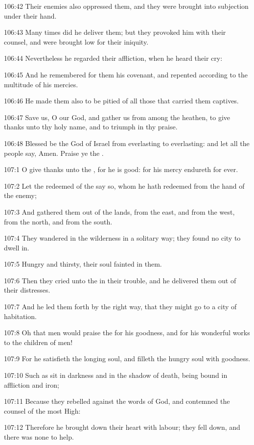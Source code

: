 106:42 Their enemies also oppressed them, and they were brought into
subjection under their hand.

106:43 Many times did he deliver them; but they provoked him with
their counsel, and were brought low for their iniquity.

106:44 Nevertheless he regarded their affliction, when he heard their
cry:

106:45 And he remembered for them his covenant, and repented according
to the multitude of his mercies.

106:46 He made them also to be pitied of all those that carried them
captives.

106:47 Save us, O \LORD our God, and gather us from among the heathen,
to give thanks unto thy holy name, and to triumph in thy praise.

106:48 Blessed be the \LORD God of Israel from everlasting to
everlasting: and let all the people say, Amen. Praise ye the \LORD.



107:1 O give thanks unto the \LORD, for he is good: for his mercy
endureth for ever.

107:2 Let the redeemed of the \LORD say so, whom he hath redeemed from
the hand of the enemy;

107:3 And gathered them out of the lands, from the east, and from the
west, from the north, and from the south.

107:4 They wandered in the wilderness in a solitary way; they found no
city to dwell in.

107:5 Hungry and thirsty, their soul fainted in them.

107:6 Then they cried unto the \LORD in their trouble, and he delivered
them out of their distresses.

107:7 And he led them forth by the right way, that they might go to a
city of habitation.

107:8 Oh that men would praise the \LORD for his goodness, and for his
wonderful works to the children of men!

107:9 For he satisfieth the longing soul, and filleth the hungry soul
with goodness.

107:10 Such as sit in darkness and in the shadow of death, being bound
in affliction and iron;

107:11 Because they rebelled against the words of God, and contemned
the counsel of the most High:

107:12 Therefore he brought down their heart with labour; they fell
down, and there was none to help.

